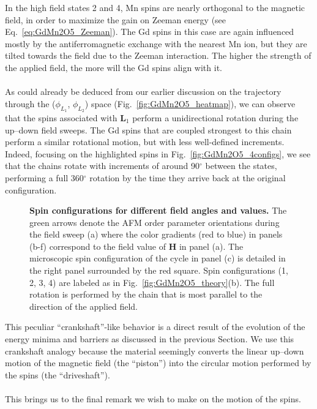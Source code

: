 In the high field states 2 and 4, Mn spins are nearly orthogonal to the magnetic field, in order to maximize the gain on Zeeman energy (see Eq.~\eqref{eq:GdMn2O5_Zeeman}).
The Gd spins in this case are again influenced mostly by the antiferromagnetic exchange with the nearest Mn ion, but they are tilted towards the field due to the Zeeman interaction.
The higher the strength of the applied field, the more will the Gd spins align with it.
\\\\
As could already be deduced from our earlier discussion on the trajectory through the ($\phi_{L_1}$, $\phi_{L_2}$) space (Fig.~\ref{fig:GdMn2O5_heatmap}), we can observe that the spins associated with $\bm L_1$ perform a unidirectional rotation during the up--down field sweeps.
The Gd spins that are coupled strongest to this chain perform a similar rotational motion, but with less well-defined increments.
Indeed, focusing on the highlighted spins in Fig.~\ref{fig:GdMn2O5_4configs}, we see that the chains rotate with increments of around 90$^\circ$ between the states, performing a full 360$^\circ$ rotation by the time they arrive back at the original configuration.
\begin{figure}
	\caption{{\bf Spin configurations for different field angles and values.} The green arrows denote the AFM order parameter orientations during the field sweep (a) where the color gradients (red to blue) in panels (b-f) correspond to the field value of $\bm{H}$ in panel (a). The microscopic spin configuration of the cycle in panel (c) is detailed in the right panel surrounded by the red square. Spin configurations (1, 2, 3, 4) are labeled as in Fig.~\ref{fig:GdMn2O5_theory}(b). The full rotation is performed by the chain that is most parallel to the direction of the applied field. \label{fig:GdMn2O5_regimes}}  
\end{figure}
This peculiar ``crankshaft''-like behavior is a direct result of the evolution of the energy minima and barriers as discussed in the previous Section.
We use this crankshaft analogy because the material seemingly converts the linear up--down motion of the magnetic field (the ``piston'') into the circular motion performed by the spins (the ``driveshaft'').
\\\\
This brings us to the final remark we wish to make on the motion of the spins.
